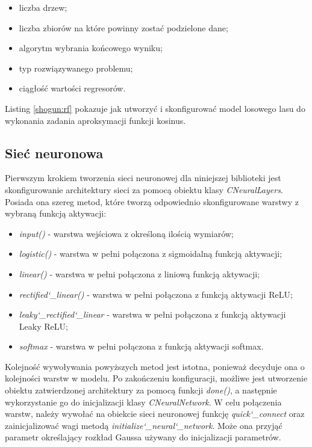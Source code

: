\begin{itemize}
	\item liczba drzew;
	\item liczba zbiorów na które powinny zostać podzielone dane;
	\item algorytm wybrania końcowego wyniku;
	\item typ rozwiązywanego problemu;
	\item ciągłość wartości regresorów.
\end{itemize}

Listing \ref{shogun:rf} pokazuje jak utworzyć i skonfigurować model losowego lasu do wykonania zadania aproksymacji funkcji kosinus.


\subsection{Sieć neuronowa}

Pierwszym krokiem tworzenia sieci neuronowej dla niniejszej biblioteki jest skonfigurowanie architektury sieci za pomocą obiektu klasy \textit{CNeuralLayers}. Posiada ona szereg metod, które tworzą odpowiednio skonfigurowane warstwy z wybraną funkcją aktywacji:

\begin{itemize}
	\item \textit{input()} - warstwa wejściowa z określoną ilością wymiarów;
	\item \textit{logistic()} - warstwa w pełni połączona z sigmoidalną funkcją aktywacji;
	\item \textit{linear()} - warstwa w pełni połączona z liniową funkcją aktywacji;
	\item \textit{rectified\char`_linear()} - warstwa w pełni połączona z funkcją aktywacji ReLU;
	\item \textit{leaky\char`_rectified\char`_linear} - warstwa w pełni połączona z funkcją aktywacji Leaky ReLU;
	\item \textit{softmax} - warstwa w pełni połączona z funkcją aktywacji softmax. 
\end{itemize}

Kolejność wywoływania powyższych metod jest istotna, ponieważ decyduje ona o kolejności warstw w modelu. Po zakończeniu konfiguracji, możliwe jest utworzenie obiektu zatwierdzonej architektury za pomocą funkcji \textit{done()}, a następnie wykorzystanie go do inicjalizacji klasy \textit{CNeuralNetwork}. W celu połączenia warstw, należy wywołać na obiekcie sieci neuronowej funkcję \textit{quick\char`_connect} oraz zainicjalizować wagi metodą \textit{initialize\char`_neural\char`_network}. Może ona przyjąć parametr określający rozkład Gaussa używany do inicjalizacji parametrów.

